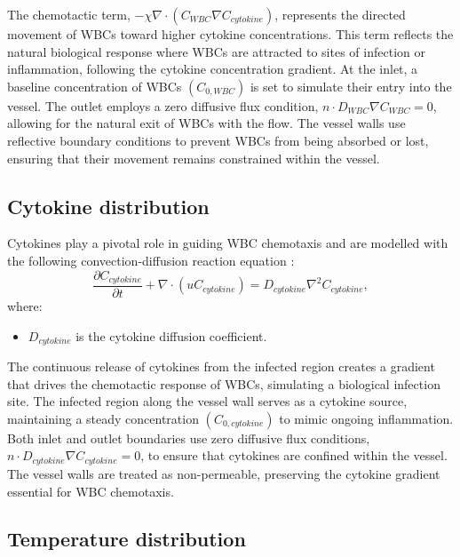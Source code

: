 \documentclass[10pt]{NSP1}
\begin{document}
	The chemotactic term, $-\chi\nabla \cdot (C_{WBC}\nabla C_{cytokine})$, represents the directed movement of WBCs toward higher cytokine concentrations. This term reflects the natural biological response where WBCs are attracted to sites of infection or inflammation, following the cytokine concentration gradient. At the inlet, a baseline concentration of WBCs $(C_{0,WBC})$ is set to simulate their entry into the vessel. The outlet employs a zero diffusive flux condition, $n\cdot D_{WBC}\nabla C_{WBC} = 0$, allowing for the natural exit of WBCs with the flow. The vessel walls use reflective boundary conditions to prevent WBCs from being absorbed or lost, ensuring that their movement remains constrained within the vessel.
	
	\subsection{Cytokine distribution}
	\label{sec:cytokine}
	
	Cytokines play a pivotal role in guiding WBC chemotaxis and are modelled with the following convection-diffusion reaction equation \cite{Cavaillon1994,Budu2008}:
	\begin{equation}\label{eq:cytokine}
		\frac{\partial C_{cytokine}}{\partial t} + \nabla \cdot (uC_{cytokine}) = D_{cytokine}\nabla^{2}C_{cytokine},
	\end{equation}
	where:
	\begin{itemize}
		\item $D_{cytokine}$ is the cytokine diffusion coefficient.
	\end{itemize}
	
	The continuous release of cytokines from the infected region creates a gradient that drives the chemotactic response of WBCs, simulating a biological infection site. The infected region along the vessel wall serves as a cytokine source, maintaining a steady concentration $(C_{0,cytokine})$ to mimic ongoing inflammation. Both inlet and outlet boundaries use zero diffusive flux conditions, $n\cdot D_{cytokine}\nabla C_{cytokine} = 0$, to ensure that cytokines are confined within the vessel. The vessel walls are treated as non-permeable, preserving the cytokine gradient essential for WBC chemotaxis.
	
	\subsection{Temperature distribution}
	\label{sec:temperature}
	
\end{document}
